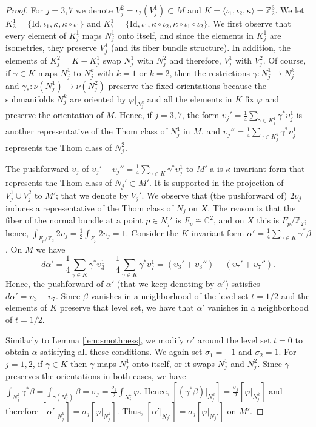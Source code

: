 \documentclass[10pt]{article}
\newcommand{\g}{\gamma}
\newcommand{\C}{\mathbb C}
\newcommand{\Z}{\mathbb Z}
\newcommand{\la}{\langle}
\newcommand{\ra}{\rangle}
\theoremstyle{plain}
\theoremstyle{definition}
\theoremstyle{remark}
\begin{document}
\begin{proof}
For $j=3,7$ we denote $V_j^2=\iota_2(V_j^1)\subset M$
and $K=\la \iota_1,\iota_2,\kappa \ra=\Z_2^3$.
We let $K_3^1=\{\mathrm{Id}, \iota_1, \kappa, \kappa \circ \iota_1\}$ and $K_7^1=\{\mathrm{Id}, \iota_1, \kappa \circ \iota_2, \kappa \circ \iota_1 \circ \iota_2\}$.
We first observe that every element of $K_j^1$ maps $N_j^1$ onto itself, and since the elements in $K_j^1$ are isometries, they preserve $V_j^1$ (and its fiber bundle structure). In addition, the elements of 
$K_j^2=K-K_j^1$
swap $N_j^1$ with $N_j^2$ and therefore, $V_j^1$ with $V_j^2$. 
Of course, if $\gamma\in K$ maps $N_j^1$ to $N_j^k$ with $k=1$ or $k=2$, then the restrictions $\gamma\colon N_j^1 \to N_j^k$ and $\gamma_* \colon {\nu(N_j^1)}\to {\nu(N_j^2)}$ preserve the fixed orientations because the submanifolds $N_j^k$ are oriented by
 $\varphi|_{N_j^k}$ and all the elements in $K$ fix $\varphi$ and preserve the orientation of $M$. Hence, if
$j=3,7$, the form $\upsilon_j'=\frac{1}{4}\sum_{\gamma\in K_j^1}\gamma^*\upsilon_j^1$ is another representative of the Thom class of $N_j^1$ in $M$, and $\upsilon_j''=\frac{1}{4}\sum_{\gamma\in K_j^2}\gamma^*\upsilon_j^1$ represents the Thom class of $N_j^2$.


The pushforward $\upsilon_j$ of $\upsilon_j'+\upsilon_j''=\frac{1}{4} \sum_{\gamma \in K} \gamma^* \upsilon_j^1$ to $M'$ a is $\kappa$-invariant form that represents the Thom class of $N_j'\subset M'$. It is supported in the projection of $V_j^1\cup V_j^2$ to $M'$; that we denote by $V_j'$.
We observe that (the pushforward of) $2\upsilon_j$ induces a representative of the Thom class of $N_j$ on $X$. The reason is that
 the fiber of the normal bundle at a point $p\in N_j'$ is $F_p\cong \C^2$, and on $X$ this is $F_p/\Z_2$; hence,
$
\int_{F_p/\Z_2}{2\upsilon_j}=\frac{1}{2}\int_{F_p}{2\upsilon_j}=1.
$
Consider the $K$-invariant form $\alpha'=\frac{1}{4}\sum_{\g\in K} \g^*\beta$. On $M$ we have $$
d\alpha'=\frac{1}{4}\sum_{\g\in K} \g^*\upsilon_3^1 - \frac{1}{4}\sum_{\g\in K} \g^*\upsilon_7^1
=(\upsilon_3'+\upsilon_3'')-(\upsilon_7'+\upsilon_7'').
$$
Hence, the pushforward of $\alpha'$ (that we keep denoting by $\alpha'$) satisfies $d\alpha'=\upsilon_3-\upsilon_7$. Since $\beta$ vanishes in a neighborhood of the level set $t=1/2$ and the elements of $K$ preserve that level set, we have that $\alpha'$ vanishes in a neighborhood of $t=1/2$.

Similarly to Lemma \ref{lem:smothness}, we modify $\alpha'$ around the level set $t=0$ to obtain $\alpha$ satisfying all these conditions. We again set $\sigma_1=-1$ and $\sigma_2=1$. For $j=1,2$, if $\gamma \in K$ then $\gamma$ maps $N_j^1$ onto itself, or it swaps $N_j^1$ and $N_j^2$. Since $\gamma$ preserves the orientations in both cases, we have 
$
\int_{N_j^k} \gamma^*\beta= \int_{\gamma(N_j^k)} \beta= {\sigma_j}= \frac{\sigma_j}{2}\int_{N_j^k} \varphi.  
$
Hence, $[(\gamma^*\beta)|_{N_j^k}]=\frac{\sigma_j}{2}[\varphi|_{N_j^k}]$ and  therefore $[\alpha'|_{N_j^k}]=\sigma_j[\varphi|_{N_j^k}]$. Thus,  $[\alpha'|_{N_j'}]=\sigma_j[\varphi|_{N_j'}]$ on $M'$.


\end{proof}
\end{document}
